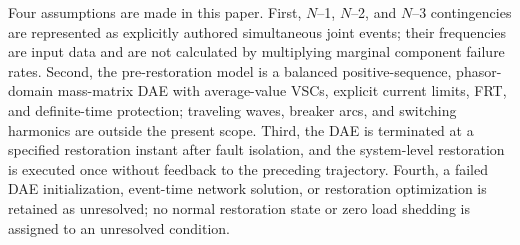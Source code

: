 Four assumptions are made in this paper. First, $N$--1, $N$--2, and $N$--3
contingencies are represented as explicitly authored simultaneous joint events;
their frequencies are input data and are not calculated by multiplying
marginal component failure rates. Second, the pre-restoration model is a
balanced positive-sequence, phasor-domain mass-matrix DAE with average-value
VSCs, explicit current limits, FRT, and definite-time protection; traveling
waves, breaker arcs, and switching harmonics are outside the present scope.
Third, the DAE is terminated at a specified restoration instant after fault
isolation, and the system-level restoration is executed once without feedback
to the preceding trajectory. Fourth, a failed DAE initialization, event-time
network solution, or restoration optimization is retained as unresolved; no
normal restoration state or zero load shedding is assigned to an unresolved
condition.



